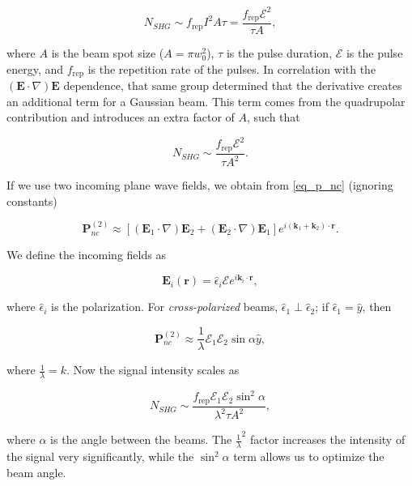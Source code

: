 \documentclass[10pt]{article}
\begin{document}
\begin{equation}
N_{SHG} \sim f_{\text{rep}}I^{2}A\tau = \frac{f_{\text{rep}}\mathcal{E}^{2}}{\tau A},
\end{equation}

where $A$ is the beam spot size ($A = \pi w^{2}_{0}$), $\tau$ is the pulse duration, $\mathcal{E}$ is the pulse energy, and $f_{\text{rep}}$ is the repetition rate of the pulses. In correlation with the $\left(\mathbf{E}\cdot\nabla\right)\mathbf{E}$ dependence, that same group determined that the derivative creates an additional term for a Gaussian beam. This term comes from the quadrupolar contribution and introduces an extra factor of $A$, such that

\begin{equation}
N_{SHG} \sim \frac{f_{\text{rep}}\mathcal{E}^{2}}{\tau A^{2}}.
\end{equation}

If we use two incoming plane wave fields, we obtain from \eqref{eq_p_nc} (ignoring constants)

\begin{equation}
\mathbf{P}^{(2)}_{nc} \approx \left[(\mathbf{E}_{1}\cdot\nabla)\mathbf{E}_{2} + (\mathbf{E}_{2}\cdot\nabla)\mathbf{E}_{1}\right]e^{i(\mathbf{k}_{1} + \mathbf{k}_{2})\cdot\mathbf{r}}.
\end{equation}

We define the incoming fields as

\begin{equation}
\mathbf{E}_{i}(\mathbf{r}) = \hat{\epsilon}_{i}\mathcal{E}e^{i\mathbf{k}_{i}\cdot\mathbf{r}},
\end{equation}

where $\hat{\epsilon}_{i}$ is the polarization. For \emph{cross-polarized} beams, $\hat{\epsilon}_{1}\perp\hat{\epsilon}_{2}$; if $\hat{\epsilon}_{1} = \hat{y}$, then

\begin{equation}
\mathbf{P}^{(2)}_{nc} \approx \frac{1}{\lambda}\mathcal{E}_{1}\mathcal{E}_{2}\sin\alpha\hat{y},
\end{equation}

where $\frac{1}{\lambda} = k$. Now the signal intensity scales as 

\begin{equation}
N_{SHG} \sim \frac{f_{\text{rep}}\mathcal{E}_{1}\mathcal{E}_{2}\sin^{2}\alpha}{\lambda^{2}\tau A^{2}},
\end{equation}

where $\alpha$ is the angle between the beams. The $\frac{1}{\lambda}^{2}$ factor increases the intensity of the signal very significantly, while the $\sin^{2}\alpha$ term allows us to optimize the beam angle.
\end{document}
